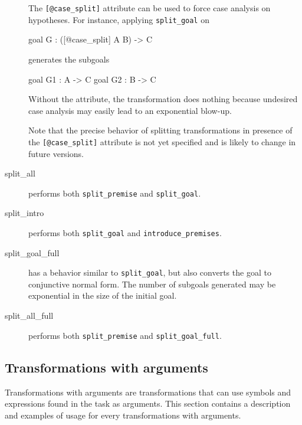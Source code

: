 \begin{description}
The \verb|[@case_split]| attribute can be used to force case analysis on hypotheses.
For instance, applying \texttt{split\_goal} on
\begin{whycode}
goal G : ([@case_split] A \/ B) -> C
\end{whycode}
generates the subgoals
\begin{whycode}
goal G1 : A -> C
goal G2 : B -> C
\end{whycode}
Without the attribute, the transformation does nothing because undesired case analysis
may easily lead to an exponential blow-up.

Note that the precise behavior of splitting transformations in presence of
the \verb|[@case_split]| attribute is not yet specified
and is likely to change in future versions.


\item[split\_all]
  performs both \texttt{split\_premise} and \texttt{split\_goal}.

\item[split\_intro]
  performs both \texttt{split\_goal} and \texttt{introduce\_premises}.

\item[split\_goal\_full]
  has a behavior similar
  to \texttt{split\_goal}, but also converts the goal to conjunctive normal form.
  The number of subgoals generated may be exponential in the size of the initial goal.

\item[split\_all\_full]
  performs both \texttt{split\_premise} and \texttt{split\_goal\_full}.


\end{description}

\subsection{Transformations with arguments}

Transformations with arguments are transformations that can use symbols and
expressions found in the task as arguments. This section contains a description
and examples of usage for every transformations with arguments.

